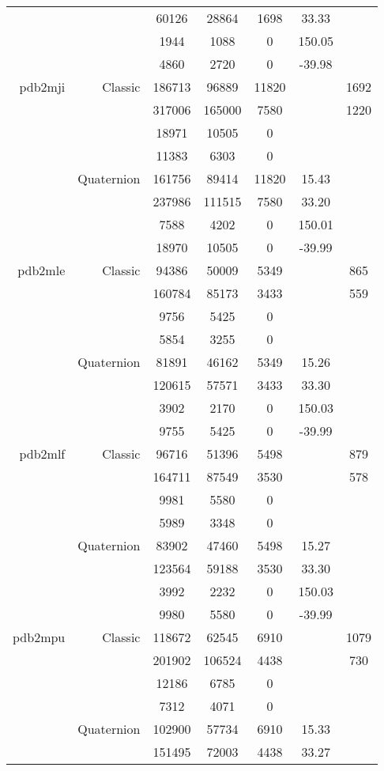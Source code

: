 \begin{xltabular}{\textwidth}{r|rcccSc}
& & 60126 & 28864 & 1698 & 33.33 & \\
& & 1944 & 1088 & 0 & 150.05 & \\
& & 4860 & 2720 & 0 & -39.98 & \\ \addlinespace
pdb2mji & Classic & 186713 & 96889 & 11820 & & 1692 \\
& & 317006 & 165000 & 7580 & & 1220 \\
& & 18971 & 10505 & 0 & & \\
& & 11383 & 6303 & 0 & & \\
& Quaternion & 161756 & 89414 & 11820 & 15.43 & \\
& & 237986 & 111515 & 7580 & 33.20 & \\
& & 7588 & 4202 & 0 & 150.01 & \\
& & 18970 & 10505 & 0 & -39.99 & \\ \addlinespace
pdb2mle & Classic & 94386 & 50009 & 5349 & & 865 \\
& & 160784 & 85173 & 3433 & & 559 \\
& & 9756 & 5425 & 0 & & \\
& & 5854 & 3255 & 0 & & \\
& Quaternion & 81891 & 46162 & 5349 & 15.26 & \\
& & 120615 & 57571 & 3433 & 33.30 & \\
& & 3902 & 2170 & 0 & 150.03 & \\
& & 9755 & 5425 & 0 & -39.99 & \\ \addlinespace
pdb2mlf & Classic & 96716 & 51396 & 5498 & & 879 \\
& & 164711 & 87549 & 3530 & & 578 \\
& & 9981 & 5580 & 0 & & \\
& & 5989 & 3348 & 0 & & \\
& Quaternion & 83902 & 47460 & 5498 & 15.27 & \\
& & 123564 & 59188 & 3530 & 33.30 & \\
& & 3992 & 2232 & 0 & 150.03 & \\
& & 9980 & 5580 & 0 & -39.99 & \\ \addlinespace
pdb2mpu & Classic & 118672 & 62545 & 6910 & & 1079 \\
& & 201902 & 106524 & 4438 & & 730 \\
& & 12186 & 6785 & 0 & & \\
& & 7312 & 4071 & 0 & & \\
& Quaternion & 102900 & 57734 & 6910 & 15.33 & \\
& & 151495 & 72003 & 4438 & 33.27 & \\

\end{xltabular}
